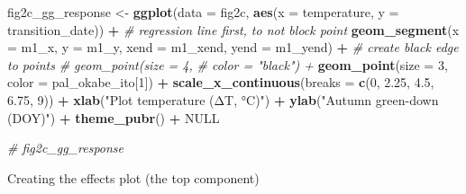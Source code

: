 \documentclass[]{book}
\newenvironment{Shaded}{\begin{snugshade}}{\end{snugshade}}
\newcommand{\CommentTok}[1]{\textcolor[rgb]{0.56,0.35,0.01}{\textit{#1}}}
\newcommand{\DataTypeTok}[1]{\textcolor[rgb]{0.13,0.29,0.53}{#1}}
\newcommand{\DecValTok}[1]{\textcolor[rgb]{0.00,0.00,0.81}{#1}}
\newcommand{\FloatTok}[1]{\textcolor[rgb]{0.00,0.00,0.81}{#1}}
\newcommand{\KeywordTok}[1]{\textcolor[rgb]{0.13,0.29,0.53}{\textbf{#1}}}
\newcommand{\NormalTok}[1]{#1}
\newcommand{\OperatorTok}[1]{\textcolor[rgb]{0.81,0.36,0.00}{\textbf{#1}}}
\newcommand{\OtherTok}[1]{\textcolor[rgb]{0.56,0.35,0.01}{#1}}
\newcommand{\StringTok}[1]{\textcolor[rgb]{0.31,0.60,0.02}{#1}}
\begin{document}
\begin{Shaded}
\begin{Highlighting}[]
\NormalTok{fig2c_gg_response <-}\StringTok{ }\KeywordTok{ggplot}\NormalTok{(}\DataTypeTok{data =}\NormalTok{ fig2c,}
             \KeywordTok{aes}\NormalTok{(}\DataTypeTok{x =}\NormalTok{ temperature,}
                \DataTypeTok{y =}\NormalTok{ transition_date)) }\OperatorTok{+}
\StringTok{  }
\StringTok{  }\CommentTok{# regression line first, to not block point}
\StringTok{  }\KeywordTok{geom_segment}\NormalTok{(}\DataTypeTok{x =}\NormalTok{ m1_x,}
               \DataTypeTok{y =}\NormalTok{ m1_y,}
               \DataTypeTok{xend =}\NormalTok{ m1_xend,}
               \DataTypeTok{yend =}\NormalTok{ m1_yend) }\OperatorTok{+}
\StringTok{  }\CommentTok{# create black edge to points}
\StringTok{  }\CommentTok{# geom_point(size = 4,}
\StringTok{  }\CommentTok{#            color = "black") +}
\StringTok{  }\KeywordTok{geom_point}\NormalTok{(}\DataTypeTok{size =} \DecValTok{3}\NormalTok{,}
             \DataTypeTok{color =}\NormalTok{ pal_okabe_ito[}\DecValTok{1}\NormalTok{]) }\OperatorTok{+}
\StringTok{   }\KeywordTok{scale_x_continuous}\NormalTok{(}\DataTypeTok{breaks =} \KeywordTok{c}\NormalTok{(}\DecValTok{0}\NormalTok{, }\FloatTok{2.25}\NormalTok{, }\FloatTok{4.5}\NormalTok{, }\FloatTok{6.75}\NormalTok{, }\DecValTok{9}\NormalTok{)) }\OperatorTok{+}
\StringTok{  }\KeywordTok{xlab}\NormalTok{(}\StringTok{"Plot temperature (ΔT, °C)"}\NormalTok{) }\OperatorTok{+}
\StringTok{  }\KeywordTok{ylab}\NormalTok{(}\StringTok{"Autumn green-down (DOY)"}\NormalTok{) }\OperatorTok{+}
\StringTok{  }\KeywordTok{theme_pubr}\NormalTok{() }\OperatorTok{+}
\StringTok{  }
\StringTok{  }\OtherTok{NULL}

\CommentTok{# fig2c_gg_response}
\end{Highlighting}
\end{Shaded}

Creating the effects plot (the top component)
\end{document}
